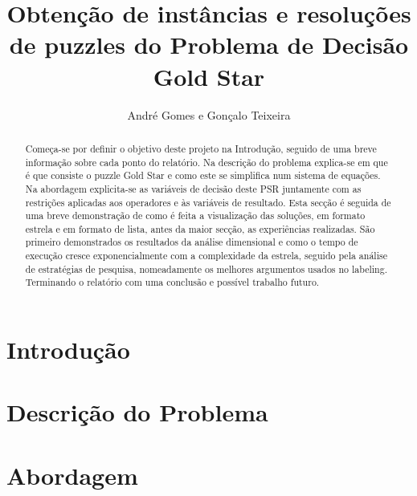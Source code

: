 \documentclass[runningheads]{llncs}
\begin{document}
%
\title{Obtenção de instâncias e resoluções de puzzles do Problema de Decisão Gold Star}
%
%
\author{André Gomes e
Gonçalo Teixeira}
%
%
%
\maketitle              %
%
\begin{abstract}
Começa-se por definir o objetivo deste projeto na Introdução, seguido de uma breve informação sobre cada ponto do relatório. Na descrição do problema explica-se em que é que consiste o puzzle Gold Star e como este se simplifica num sistema de equações. Na abordagem explicita-se as variáveis de decisão deste PSR juntamente com as restrições aplicadas aos operadores e às variáveis de resultado. Esta secção é seguida de uma breve demonstração de como é feita a visualização das soluções, em formato estrela e em formato de lista, antes da maior secção, as experiências realizadas. São primeiro demonstrados os resultados da análise dimensional e como o tempo de execução cresce exponencialmente com a complexidade da estrela, seguido pela análise de estratégias de pesquisa, nomeadamente os melhores argumentos usados no labeling. Terminando o relatório com uma conclusão e possível trabalho futuro.

\end{abstract}
%
%
%
\section{Introdução}


\section{Descrição do Problema}


\section{Abordagem}

\end{document}
